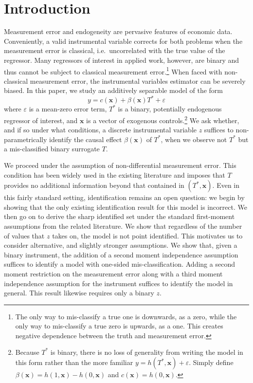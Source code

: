 \section{Introduction}

Measurement error and endogeneity are pervasive features of economic data.
Conveniently, a valid instrumental variable corrects for both problems when the measurement error is classical, i.e.\ uncorrelated with the true value of the regressor.
Many regressors of interest in applied work, however, are binary and thus cannot be subject to classical measurement error.\footnote{The only way to mis-classify a true one is downwards, as a zero, while the only way to mis-classify a true zero is upwards, as a one. This creates negative dependence between the truth and measurement error.}
When faced with non-classical measurement error, the instrumental variables estimator can be severely biased.
In this paper, we study an additively separable model of the form
\begin{equation}
  y = c(\mathbf{x}) + \beta(\mathbf{x}) T^* + \varepsilon
  \label{eq:model}
\end{equation}
where $\varepsilon$ is a mean-zero error term, $T^*$ is a binary, potentially endogenous regressor of interest, and $\mathbf{x}$ is a vector of exogenous controls.\footnote{Because $T^*$ is binary, there is no loss of generality from writing the model in this form rather than the more familiar $y = h(T^*,\mathbf{x})+\varepsilon$. Simply define $\beta(\mathbf{x}) = h(1,\mathbf{x}) - h(0,\mathbf{x})$ and $c(\mathbf{x}) = h(0,\mathbf{x})$.}
We ask whether, and if so under what conditions, a discrete instrumental variable $z$ suffices to non-parametrically identify the causal effect $\beta(\mathbf{x})$ of $T^*$, when we observe not $T^*$ but a mis-classified binary surrogate $T$. 

We proceed under the assumption of non-differential measurement error.
This condition has been widely used in the existing literature and imposes  that $T$ provides no additional information beyond that contained in $(T^*,\mathbf{x})$.
Even in this fairly standard setting, identification remains an open question: we begin by showing that the only existing identification result for this model is incorrect.
We then go on to derive the sharp identified set under the standard first-moment assumptions from the related literature.
We show that regardless of the number of values that $z$ takes on, the model is not point identified.
This motivates us to consider alternative, and slightly stronger assumptions.
We show that, given a binary instrument, the addition of a second moment independence assumption suffices to identify a model with one-sided mis-classification.
Adding a second moment restriction on the measurement error along with a third moment independence assumption for the instrument suffices to identify the model in general.
This result likewise requires only a binary $z$.

